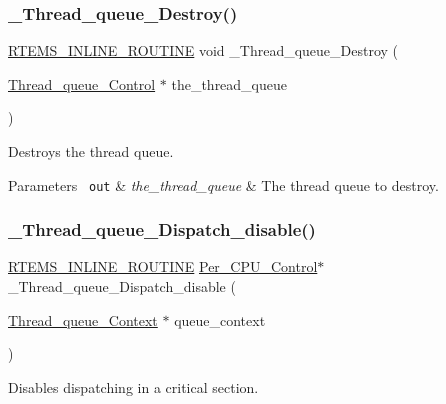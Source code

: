 \subsubsection{\texorpdfstring{\_Thread\_queue\_Destroy()}{\_Thread\_queue\_Destroy()}}
{\footnotesize\ttfamily \mbox{\hyperlink{group__RTEMSScoreBaseDefs_gac216239df231d5dbd15e3520b0b9313f}{R\+T\+E\+M\+S\+\_\+\+I\+N\+L\+I\+N\+E\+\_\+\+R\+O\+U\+T\+I\+NE}} void \+\_\+\+Thread\+\_\+queue\+\_\+\+Destroy (\begin{DoxyParamCaption}\item[{\mbox{\hyperlink{structThread__queue__Control}{Thread\+\_\+queue\+\_\+\+Control}} $\ast$}]{the\+\_\+thread\+\_\+queue }\end{DoxyParamCaption})}



Destroys the thread queue. 


\begin{DoxyParams}[1]{Parameters}
\mbox{\texttt{ out}}  & {\em the\+\_\+thread\+\_\+queue} & The thread queue to destroy. \\
\hline
\end{DoxyParams}
\mbox{\label{group__RTEMSScoreThreadQueue_ga8dcef3658d8266b9f66015474e2c88bd}} 
\subsubsection{\texorpdfstring{\_Thread\_queue\_Dispatch\_disable()}{\_Thread\_queue\_Dispatch\_disable()}}
{\footnotesize\ttfamily \mbox{\hyperlink{group__RTEMSScoreBaseDefs_gac216239df231d5dbd15e3520b0b9313f}{R\+T\+E\+M\+S\+\_\+\+I\+N\+L\+I\+N\+E\+\_\+\+R\+O\+U\+T\+I\+NE}} \mbox{\hyperlink{structPer__CPU__Control}{Per\+\_\+\+C\+P\+U\+\_\+\+Control}}$\ast$ \+\_\+\+Thread\+\_\+queue\+\_\+\+Dispatch\+\_\+disable (\begin{DoxyParamCaption}\item[{\mbox{\hyperlink{structThread__queue__Context}{Thread\+\_\+queue\+\_\+\+Context}} $\ast$}]{queue\+\_\+context }\end{DoxyParamCaption})}



Disables dispatching in a critical section. 



